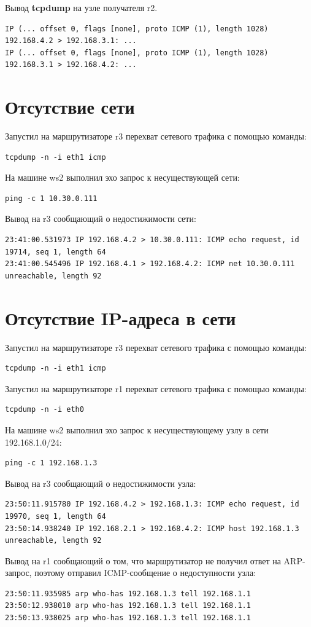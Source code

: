 \documentclass[a4paper,12pt]{article}
\begin{document}
Вывод \textbf{tcpdump} на узле получателя r2.

\begin{Verbatim}
IP (... offset 0, flags [none], proto ICMP (1), length 1028) 192.168.4.2 > 192.168.3.1: ...
IP (... offset 0, flags [none], proto ICMP (1), length 1028) 192.168.3.1 > 192.168.4.2: ...
\end{Verbatim}


\section{Отсутствие сети}

Запустил на маршрутизаторе r3 перехват сетевого трафика с помощью команды: 
\begin{Verbatim}
tcpdump -n -i eth1 icmp
\end{Verbatim}

На машине ws2 выполнил эхо запрос к несуществующей сети: 
\begin{Verbatim}
ping -c 1 10.30.0.111
\end{Verbatim}

Вывод на r3 сообщающий о недостижимости сети:
\begin{Verbatim}
23:41:00.531973 IP 192.168.4.2 > 10.30.0.111: ICMP echo request, id 19714, seq 1, length 64
23:41:00.545496 IP 192.168.4.1 > 192.168.4.2: ICMP net 10.30.0.111 unreachable, length 92
\end{Verbatim}

\section{Отсутствие IP-адреса в сети}

Запустил на маршрутизаторе r3 перехват сетевого трафика с помощью команды: 
\begin{Verbatim}
tcpdump -n -i eth1 icmp
\end{Verbatim}

Запустил на маршрутизаторе r1 перехват сетевого трафика с помощью команды: 
\begin{Verbatim}
tcpdump -n -i eth0
\end{Verbatim}

На машине ws2 выполнил эхо запрос к несуществующему узлу в сети 192.168.1.0/24: 
\begin{Verbatim}
ping -c 1 192.168.1.3
\end{Verbatim}

Вывод на r3 сообщающий о недостижимости узла:
\begin{Verbatim}
23:50:11.915780 IP 192.168.4.2 > 192.168.1.3: ICMP echo request, id 19970, seq 1, length 64
23:50:14.938240 IP 192.168.2.1 > 192.168.4.2: ICMP host 192.168.1.3 unreachable, length 92
\end{Verbatim}

Вывод на r1 сообщающий о том, что маршрутизатор не получил ответ на ARP-запрос, поэтому отправил ICMP-сообщение о недоступности узла:
\begin{Verbatim}
23:50:11.935985 arp who-has 192.168.1.3 tell 192.168.1.1
23:50:12.938010 arp who-has 192.168.1.3 tell 192.168.1.1
23:50:13.938025 arp who-has 192.168.1.3 tell 192.168.1.1
\end{Verbatim}
\end{document}
